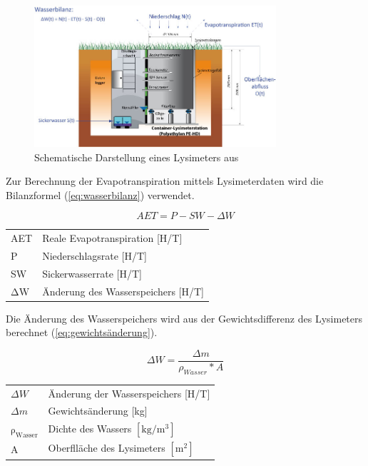 \begin{figure}[H]
\centering
\includegraphics[width=0.8\textwidth]{figures/lysimeter_schema.jpg}
\caption{Schematische Darstellung eines Lysimeters aus \cite{ugt}}
\label{fig:lysimeter_schema}
\end{figure}


Zur Berechnung der Evapotranspiration mittels Lysimeterdaten wird die Bilanzformel (\ref{eq:wasserbilanz}) verwendet.


\begin{equation}
\label{eq:wasserbilanz}
AET=P-SW-\Delta W
\end{equation}
\begin{table}[H]
\centering
\begin{tabular}{ll}
AET& Reale Evapotranspiration [H/T]\\
P& Niederschlagsrate  [H/T]\\
SW & Sickerwasserrate  [H/T]\\
$\mathrm{\Delta W}$ & Änderung des Wasserspeichers  [H/T]\\
\end{tabular}
\end{table}


Die Änderung des Wasserspeichers wird aus der Gewichtsdifferenz des Lysimeters berechnet (\ref{eq:gewichtsänderung}).


\begin{equation}
\label{eq:gewichtsänderung}
\Delta W=\frac{\Delta m}{\rho_{Wasser}* A}
\end{equation}
\begin{table}[H]
\centering
\begin{tabular}{ll}
$\Delta W$ & Änderung der Wasserspeichers [H/T]\\
$\Delta m$ & Gewichtsänderung [kg]\\
$\mathrm{\rho_{Wasser}}$ & Dichte des Wassers $\mathrm{[kg/m^3]}$\\
A & Oberflläche des Lysimeters $\mathrm{[m^2]}$
\end{tabular}
\end{table}

